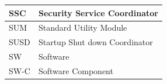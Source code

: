 \begin{longtable}{|l|l|}
\begin{minipage}{0.31\linewidth}\raggedright\vspace{.75ex}SSC\vspace{.75ex}\end{minipage} & \begin{minipage}{0.63\linewidth}\raggedright\vspace{.75ex}Security Service Coordinator\vspace{.75ex}\end{minipage}\\\hline
\begin{minipage}{0.31\linewidth}\raggedright\vspace{.75ex}SUM\vspace{.75ex}\end{minipage} & \begin{minipage}{0.63\linewidth}\raggedright\vspace{.75ex}Standard Utility Module\vspace{.75ex}\end{minipage}\\\hline
\begin{minipage}{0.31\linewidth}\raggedright\vspace{.75ex}SUSD\vspace{.75ex}\end{minipage} & \begin{minipage}{0.63\linewidth}\raggedright\vspace{.75ex}Startup Shut down Coordinator\vspace{.75ex}\end{minipage}\\\hline
\begin{minipage}{0.31\linewidth}\raggedright\vspace{.75ex}SW\vspace{.75ex}\end{minipage} & \begin{minipage}{0.63\linewidth}\raggedright\vspace{.75ex}Software\vspace{.75ex}\end{minipage}\\\hline
\begin{minipage}{0.31\linewidth}\raggedright\vspace{.75ex}SW-C\vspace{.75ex}\end{minipage} & \begin{minipage}{0.63\linewidth}\raggedright\vspace{.75ex}Software Component\vspace{.75ex}\end{minipage}\\\hline

\end{longtable}
